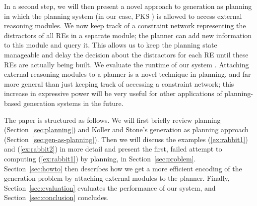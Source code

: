 In a second step, we will then present a novel approach to generation
as planning in which the planning system (in our case, PKS
\cite{Petrick-Bacchus:02}) is allowed to access external reasoning
modules.  We now keep track of a constraint network representing the
distractors of all REs \cite{dale91:_gener_refer_expres_invol_relat}
in a separate module; the planner can add new information to this
module and query it.  This allows us to keep the planning state
manageable and delay the decision about the distractors for each RE
until these REs are actually being built.  We evaluate the runtime of
our system .  Attaching external reasoning modules to a
planner is a novel technique in planning, and far more general than
just keeping track of accessing a constraint network; this increase in
expressive power will be very useful for other applications of
planning-based generation systems in the future.



The paper is structured as follows. We will first briefly review
planning (Section~\ref{sec:planning}) and Koller and Stone's
generation as planning approach (Section~\ref{sec:gen-as-planning}).
Then we will discuss the examples (\ref{ex:rabbit1}) and
(\ref{ex:rabbit2}) in more detail and present the first, failed
attempt to computing (\ref{ex:rabbit1}) by planning, in
Section~\ref{sec:problem}.  Section~\ref{sec:howto} then describes how
we get a more efficient encoding of the generation problem by
attaching external modules to the planner.  Finally,
Section~\ref{sec:evaluation} evaluates the performance of our system,
and Section~\ref{sec:conclusion} concludes.






